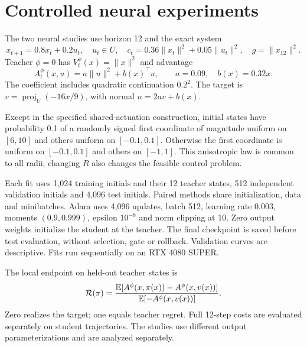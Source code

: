 \section{Controlled neural experiments}\label{sec:neural-setup}
The two neural studies use horizon 12 and the exact system
\begin{equation}\label{eq:neural-system}
 x_{t+1}=0.8x_t+0.2u_t,\quad u_t\in U,\quad
 c_t=0.36\|x_t\|^2+0.05\|u_t\|^2,\quad g=\|x_{12}\|^2.
\end{equation}
Teacher $\phi=0$ has $V_t^\phi(x)=\|x\|^2$ and advantage
\begin{equation}\label{eq:neural-advantage}
 A_t^\phi(x,u)=a\|u\|^2+b(x)^\top u,\qquad a=0.09,\quad b(x)=0.32x.
\end{equation}
The coefficient includes quadratic continuation $0.2^2$. The target is
$v=\operatorname{proj}_U(-16x/9)$, with normal $n=2av+b(x)$.

Except in the specified shared-actuation construction, initial states
have probability 0.1 of a randomly signed first coordinate of magnitude
uniform on $[6,10]$ and others uniform on $[-0.1,0.1]$. Otherwise the
first coordinate is uniform on $[-0.1,0.1]$ and others on $[-1,1]$.
This anisotropic law is common to all radii; changing $R$ also changes
the feasible control problem.

Each fit uses 1,024 training initials and their 12 teacher states,
512 independent validation initials and 4,096 test initials. Paired
methods share initialization, data and minibatches. Adam uses 4,096
updates, batch 512, learning rate 0.003, moments $(0.9,0.999)$,
epsilon $10^{-8}$ and norm clipping at 10. Zero output weights initialize
the student at the teacher. The final checkpoint is saved before test
evaluation, without selection, gate or rollback. Validation curves are
descriptive. Fits run sequentially on an RTX 4080 SUPER.

The local endpoint on held-out teacher states is
\begin{equation}\label{eq:normalized-regret}
 \mathcal R(\pi)=\frac{\mathbb E[A^\phi(x,\pi(x))-A^\phi(x,v(x))]}
                         {\mathbb E[-A^\phi(x,v(x))]}.
\end{equation}
Zero realizes the target; one equals teacher regret. Full 12-step
costs are evaluated separately on student trajectories. The studies
use different output parameterizations and are analyzed separately.
